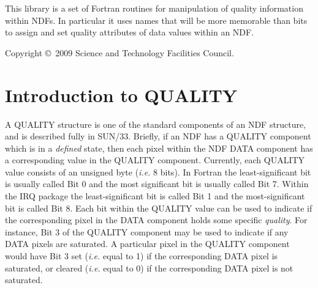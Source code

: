 \documentclass[twoside,11pt]{article}
\newcommand{\stardocinitials}  {SUN}
\newcommand{\stardoccopyright} 
{Copyright \copyright\ 2009 Science and Technology Facilities Council.}
\newcommand{\stardocnumber}    {261.1}
\newcommand{\stardocabstract}  {
This library is a set of Fortran routines for manipulation of quality
information within NDFs.  In particular it uses names that will be more
memorable than bits to assign and set quality attributes of data values
within an NDF.
}
\newcommand{\stardocname}{\stardocinitials /\stardocnumber}
\newenvironment{latexonly}{}{}
\newcommand{\xref}[3]{#1}
\newcommand{\xlabel}[1]{}
\renewcommand{\_}{\texttt{\symbol{95}}}
\renewcommand{\thepage}{\roman{page}}
\begin{document}

\stardocabstract

\begin{latexonly}
\newpage
\vspace*{\fill}
\stardoccopyright
\end{latexonly}

  \newpage
  \begin{latexonly}
    \setlength{\parskip}{0mm}
    \tableofcontents
    \setlength{\parskip}{\medskipamount}
    \markboth{\stardocname}{\stardocname}
  \end{latexonly}

\cleardoublepage
\renewcommand{\thepage}{\arabic{page}}
\setcounter{page}{1}



\section {\xlabel{SEC:intro}Introduction to QUALITY}

A QUALITY structure is one of the standard components of an NDF
structure, and is described fully in
\xref{SUN/33}{sun33}{the_quality_component_in_more_detail}. Briefly,
if an NDF has a QUALITY component which is in a {\em defined} state,
then each pixel within the NDF DATA component has a corresponding
value in the QUALITY component. Currently, each QUALITY value consists
of an unsigned byte (\emph{i.e.} 8 bits). In Fortran the
least-significant bit is usually called Bit 0 and the most significant
bit is usually called Bit 7. Within the IRQ package the
least-significant bit is called Bit 1 and the most-significant bit is
called Bit 8. Each bit within the QUALITY value can be used to
indicate if the corresponding pixel in the DATA component holds some
specific {\em quality}. For instance, Bit 3 of the QUALITY component
may be used to indicate if any DATA pixels are saturated. A particular
pixel in the QUALITY component would have Bit 3 set (\emph{i.e.} equal
to 1) if the corresponding DATA pixel is saturated, or cleared
(\emph{i.e.} equal to 0) if the corresponding DATA pixel is not
saturated. 
\end{document}
